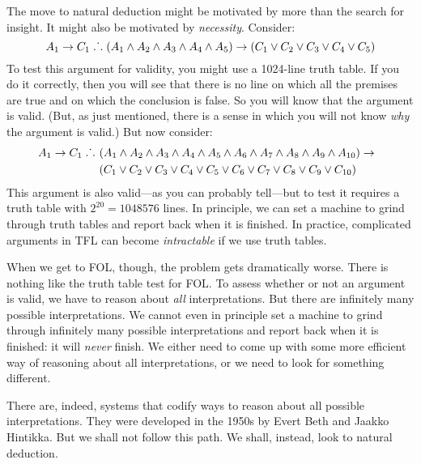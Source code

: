 The move to natural deduction might be motivated by more than the search for insight. It might also be motivated by \emph{necessity}. Consider:
	$$A_1 \rightarrow C_1 \mathrel{\ldotp\dot{}\,\ldotp} (A_1 \wedge A_2 \wedge A_3 \wedge A_4 \wedge A_5) \rightarrow (C_1 \vee C_2 \vee C_3 \vee C_4 \vee C_5)$$
To test this argument for validity, you might use a 1024-line truth table. If you do it correctly, then you will see that there is no line on which all the premises are true and on which the conclusion is false. So you will know that the argument is valid. (But, as just mentioned, there is a sense in which you will not know \emph{why} the argument is valid.) But now consider:
	\begin{align*}
		A_1 \rightarrow C_1 \mathrel{\ldotp\dot{}\,\ldotp}\ & (A_1 \wedge A_2 \wedge A_3 \wedge A_4 \wedge A_5 \wedge A_6 \wedge A_7 \wedge A_8 \wedge A_9 \wedge A_{10}) \rightarrow \phantom{(}\\
				&(C_1 \vee C_2 \vee C_3 \vee C_4 \vee C_5 \vee C_6 \vee C_7 \vee C_8 \vee C_9 \vee C_{10})
	\end{align*}
This argument is also valid---as you can probably tell---but to test it requires a truth table with $2^{20} = 1048576$ lines. In principle, we can set a machine to grind through truth tables and report back when it is finished. In practice, complicated arguments in TFL can become \emph{intractable} if we use truth tables.

When we get to FOL, though, the problem gets dramatically worse. There is nothing like the truth table test for FOL. To assess whether or not an argument is valid, we have to reason about \emph{all} interpretations. But there are infinitely many possible interpretations. We cannot even in principle set a machine to grind through infinitely many possible interpretations and report back when it is finished: it will \emph{never} finish. We either need to come up with some more efficient way of reasoning about all interpretations, or we need to look for something different. 

There are, indeed, systems that codify ways to reason about all possible interpretations. They were developed in the 1950s by Evert Beth and Jaakko Hintikka. But we shall not follow this path. We shall, instead, look to natural deduction. 
%
%
%

